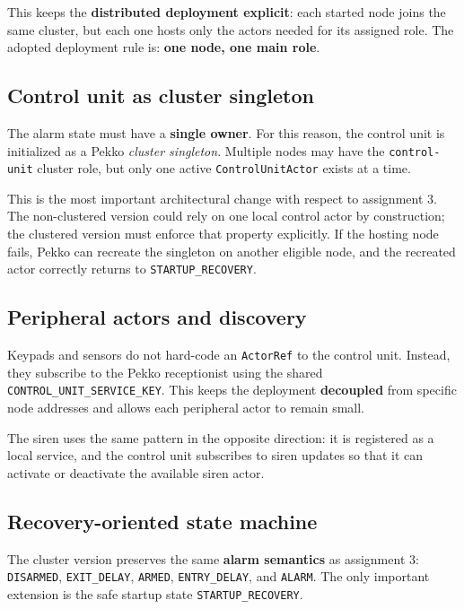 This keeps the \textbf{distributed deployment explicit}: each started node joins the same
cluster, but each one hosts only the actors needed for its assigned role.
The adopted deployment rule is:
\textbf{one node, one main role}.

\subsection{Control unit as cluster singleton}

The alarm state must have a \textbf{single owner}. For this reason, the control unit is
initialized as a Pekko \emph{cluster singleton}. Multiple nodes may have the
\texttt{control-unit} cluster role, but only one active \texttt{ControlUnitActor}
exists at a time.

This is the most important architectural change with respect to assignment 3.
The non-clustered version could rely on one local control actor by
construction; the clustered version must enforce that property explicitly.
If the hosting node fails, Pekko can recreate the singleton on another
eligible node, and the recreated actor correctly returns to
\texttt{STARTUP\_RECOVERY}.

\subsection{Peripheral actors and discovery}

Keypads and sensors do not hard-code an \texttt{ActorRef} to the control unit.
Instead, they subscribe to the Pekko receptionist using the shared
\texttt{CONTROL\_UNIT\_SERVICE\_KEY}. This keeps the deployment \textbf{decoupled} from
specific node addresses and allows each peripheral actor to remain small.

The siren uses the same pattern in the opposite direction: it is registered as
a local service, and the control unit subscribes to siren updates so that it
can activate or deactivate the available siren actor.

\subsection{Recovery-oriented state machine}

The cluster version preserves the same \textbf{alarm semantics} as assignment 3:
\texttt{DISARMED}, \texttt{EXIT\_DELAY}, \texttt{ARMED},
\texttt{ENTRY\_DELAY}, and \texttt{ALARM}. The only important extension is the
safe startup state \texttt{STARTUP\_RECOVERY}.

